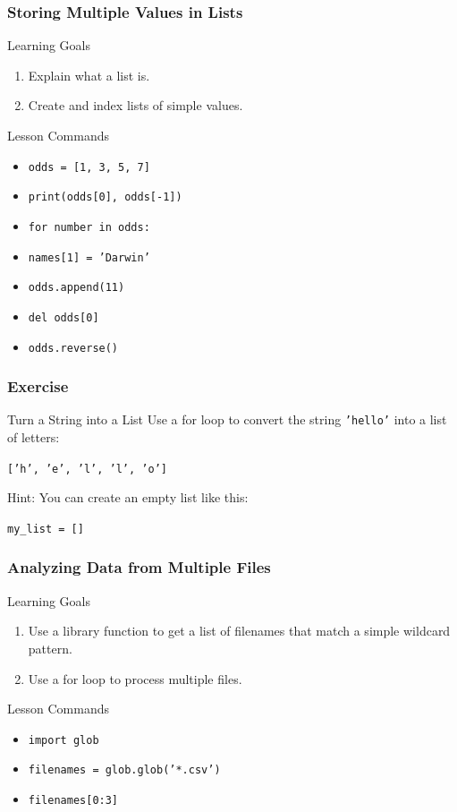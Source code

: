 \documentclass{beamer}
\begin{document}
\begin{frame}[label=lists]
  \frametitle{Storing Multiple Values in Lists}
  \begin{block}{Learning Goals}
    \begin{enumerate}
      \item Explain what a list is.
      \item Create and index lists of simple values.
    \end{enumerate}
  \end{block}
  \begin{block}{Lesson Commands}
    \begin{itemize}
      \item \texttt{odds = [1, 3, 5, 7]}
      \item \texttt{print(odds[0], odds[-1])}
      \item \texttt{for number in odds:}
      \item \texttt{names[1] = 'Darwin'}
      \item \texttt{odds.append(11)}
      \item \texttt{del odds[0]}
      \item \texttt{odds.reverse()}
    \end{itemize}
  \end{block}
\end{frame}


\begin{frame}
  \frametitle{Exercise}
  \begin{block}{Turn a String into a List}
    Use a for loop to convert the string \texttt{'hello'} into a list of letters:

    \texttt{['h', 'e', 'l', 'l', 'o']}

    Hint: You can create an empty list like this:

    \texttt{my\_list = []}
  \end{block}
\end{frame}



\begin{frame}[label=glob]
  \frametitle{Analyzing Data from Multiple Files}
  \begin{block}{Learning Goals}
    \begin{enumerate}
      \item Use a library function to get a list of filenames that match a simple wildcard pattern.
      \item Use a for loop to process multiple files.
    \end{enumerate}
  \end{block}
  \begin{block}{Lesson Commands}
    \begin{itemize}
      \item \texttt{import glob}
      \item \texttt{filenames = glob.glob('*.csv')}
      \item \texttt{filenames[0:3]}
    \end{itemize}
  \end{block}
\end{frame}
\end{document}
